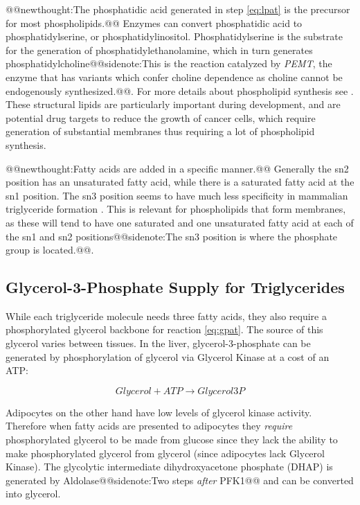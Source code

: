 \documentclass{tufte-handout}
\makeatletter
\def\newthought#1{@@newthought:#1@@}
\def\sidenote#1{@@sidenote:#1@@}
\makeatother
\begin{document}
\newthought{The phosphatidic acid generated in step \ref{eq:lpat} is the precursor for most phospholipids.}  Enzymes can convert phosphatidic acid to phosphatidylserine, or phosphatidylinositol.  Phosphatidylserine is the substrate for the generation of phosphatidylethanolamine, which in turn generates phosphatidylcholine\sidenote{This is the reaction catalyzed by \textit{PEMT}, the enzyme that has variants which confer choline dependence as choline cannot be endogenously synthesized.}.  For more details about phospholipid synthesis see \citet{Kent1995}.  These structural lipids are particularly important during development, and are potential drug targets to reduce the growth of cancer cells, which require generation of substantial membranes thus requiring a lot of phospholipid synthesis.  

\newthought{Fatty acids are added in a specific manner.}  Generally the sn2 position has an unsaturated fatty acid, while there is a saturated fatty acid at the sn1 position.  The sn3 position seems to have much less specificity in mammalian triglyceride formation \citep{Brockerhoff1971}.  This is relevant for phospholipids that form membranes, as these will tend to have one saturated and one unsaturated fatty acid at each of the sn1 and sn2 positions\sidenote{The sn3 position is where the phosphate group is located.}.  

\subsection{Glycerol-3-Phosphate Supply for Triglycerides}

While each triglyceride molecule needs three fatty acids, they also require a phosphorylated glycerol backbone for reaction \ref{eq:gpat}.  The source of this glycerol varies between tissues.  In the liver, glycerol-3-phosphate can be generated by phosphorylation of glycerol via Glycerol Kinase at a cost of an ATP:

\begin{equation}
Glycerol + ATP \rightarrow Glycerol3P
\end{equation}


Adipocytes on the other hand have low levels of glycerol kinase activity.  Therefore when fatty acids are presented to adipocytes they \emph{require} phosphorylated glycerol to be made from glucose since they lack the ability to make phosphorylated glycerol from glycerol (since adipocytes lack Glycerol Kinase).  The glycolytic intermediate dihydroxyacetone phosphate (DHAP) is generated by Aldolase\sidenote{Two steps \emph{after} PFK1} and can be converted into glycerol.
\end{document}
